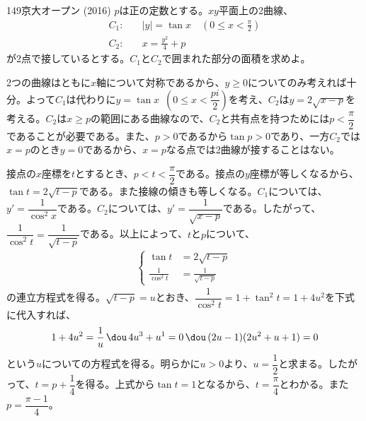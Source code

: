 \begin{thm}{149}{\maru}{京大オープン (2016)}
 $p$は正の定数とする。$xy$平面上の2曲線、
 \begin{align*}
  C_1:\quad & |y|=\tan x \quad (0\le x < \frac{\pi}{2}) \\
  C_2:\quad & x=\frac{y^2}{4}+p
 \end{align*}
 が2点で接しているとする。$C_1$と$C_2$で囲まれた部分の面積を求めよ。
\end{thm}

2つの曲線はともに$x$軸について対称であるから、$y\ge 0$についてのみ考えれば十分。よって$C_1$は代わりに$y=\tan x$~$\left(0\le x< \dfrac{pi}{2}\right)$を考え、$C_2$は$y=2\sqrt{x-p}$を考える。$C_2$は$x\ge p$の範囲にある曲線なので、$C_2$と共有点を持つためには$p<\dfrac{\pi}{2}$であることが必要である。また、$p>0$であるから$\tan p>0$であり、一方$C_2$では$x=p$のとき$y=0$であるから、$x=p$なる点では2曲線が接することはない。

接点の$x$座標を$t$とするとき、$p<t<\dfrac{\pi}{2}$である。接点の$y$座標が等しくなるから、$\tan t=2\sqrt{t-p}$である。また接線の傾きも等しくなる。$C_1$については、$y'=\dfrac{1}{\cos^2 x}$である。$C_2$については、$y'=\dfrac{1}{\sqrt{x-p}}$である。したがって、$\dfrac{1}{\cos^2 t}=\dfrac{1}{\sqrt{t-p}}$である。以上によって、$t$と$p$について、
\begin{align*}
 \left\{
 \begin{aligned}
  \tan t&=2\sqrt{t-p} \\
  \frac{1}{\cos^2 t}&=\frac{1}{\sqrt{t-p}}
 \end{aligned} \right.
\end{align*}
の連立方程式を得る。$\sqrt{t-p}=u$とおき、$\dfrac{1}{\cos^2 t}=1+\tan^2 t=1+4u^2$を下式に代入すれば、
\[ 1+4u^2=\frac{1}{u} \,\dou\, 4u^3+u^1=0 \,\dou\, (2u-1)(2u^2+u+1)=0 \]
という$u$についての方程式を得る。明らかに$u>0$より、$u=\dfrac{1}{2}$と求まる。したがって、$t=p+\dfrac{1}{4}$を得る。上式から$\tan t=1$となるから、$t=\dfrac{\pi}{4}$とわかる。また$p=\dfrac{\pi-1}{4}$。

